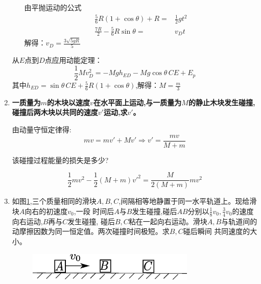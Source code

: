 \documentclass{article}
\begin{document}
\begin{enumerate}
\begin{enumerate}[label=(\arabic*)]
由平抛运动的公式
\begin{align*}
\frac{5}{6}R(1+\cos\theta)+R=&\frac{1}{2}gt^2\\
\frac{7R}{2}-\frac{5}{6}R\sin\theta=&v_Dt
\end{align*}
解得：$v_D=\frac{3\sqrt{5gR}}{5}$
\end{enumerate}
从$E$点到$D$点应用动能定理：
\[
\frac{1}{2}Mv_D^2=-Mg h_{ED}-Mg\cos\theta\,CE+E_p
\]
其中$h_{ED}=\sin\theta\,CE+\frac{5}{6}R(1+\cos\theta)$,解得：$M=\frac{m}{3}$
\item \textbf{一质量为$m$的木块以速度$v$在水平面上运动,与一质量为$M$的静止木块发生碰撞,碰撞后两木块以共同的速度$v'$运动,求$v'$。}

由动量守恒定律得:
\[
mv=mv'+Mv'\Rightarrow v'=\frac{mv}{M+m}
\]

该碰撞过程能量的损失是多少?

\[
\frac{1}{2}mv^2-\frac{1}{2}(M+m)v'^2=\frac{M}{2(M+m)}mv^2
\]

\item 如图\ref{fig:2015momentum},三个质量相同的滑块$A,B,C$,间隔相等地静置于同一水平轨道上。现给滑块$A$向右的初速度$v_0$,一段
时间后$A$与$B$发生碰撞,碰后$AB$分别以$\frac{1}{8}v_0,\frac{3}{4}v_0$的速度向右运动,$B$再与$C$发生碰撞,
碰后$B,C$粘在一起向右运动。滑块$A,B$与轨道间的动摩擦因数为同一恒定值。两次碰撞时间极短。求$B,C$碰后瞬间
共同速度的大小。
\begin{figure}[!ht]
\centering
\includegraphics[width=8cm]{2015momentum.eps}
\caption{}\label{fig:2015momentum}
\end{figure}


\end{enumerate}
\end{document}
